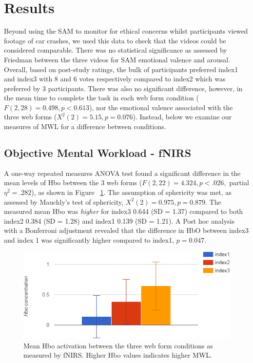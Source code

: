 \documentclass[../main/Feedback.tex]{subfiles}
\begin{document}
\section{Results}
Beyond using the SAM to monitor for ethical concerns whilst participants viewed footage of car crashes, we used this data to check that the videos could be considered comparable. 
There was no statistical significance as assessed by Friedman between the three videos for SAM emotional valence and arousal.
Overall, based on post-study ratings, the bulk of participants preferred index1 and index3 with 8 and 6 votes respectively compared to index2 which was preferred by 3 participants. 
There was also no significant difference, however, in the mean time to complete the task in each web form condition ($F(2,28)=0.498, p<0.613$), nor the emotional valence associated with the three web forms ($X^{2}(2)=5.15,p=0.076$). 
Instead, below we examine our measures of MWL for a difference between conditions.
\subsection{Objective Mental Workload - fNIRS}
A one-way repeated measures ANOVA test found a significant difference in the mean levels of Hbo between the 3 web forms ($F(2,22)=4.324, p<.026,$ partial $\eta^{2}=.282$), as shown in Figure ~\ref{fig:mean-hbo-index123}. 
The assumption of sphericity was met, as assessed by Mauchly's test of sphericity, $X^{2}(2) = 0.975, p = 0.879$. 
The measured mean Hbo was \textit{higher} for index3 0.644 (SD = 1.37) compared to both index2 0.384 (SD = 1.28) and index1 0.139 (SD = 1.21). 
A Post hoc analysis with a Bonferroni adjustment revealed that the difference in HbO between index3 and index 1 was significantly higher compared to index1, $p=0.047$.

\begin{figure}[h]
	\centering
	\includegraphics[width=1\linewidth]{../figures/mean-Hbo-concentration-index123}
	\caption[mean Hbo activation between the three web forms]{Mean Hbo activation between the three web form conditions as measured by fNIRS. Higher Hbo values indicates higher MWL.}
	\label{fig:mean-hbo-index123}
\end{figure}
		
\end{document}
